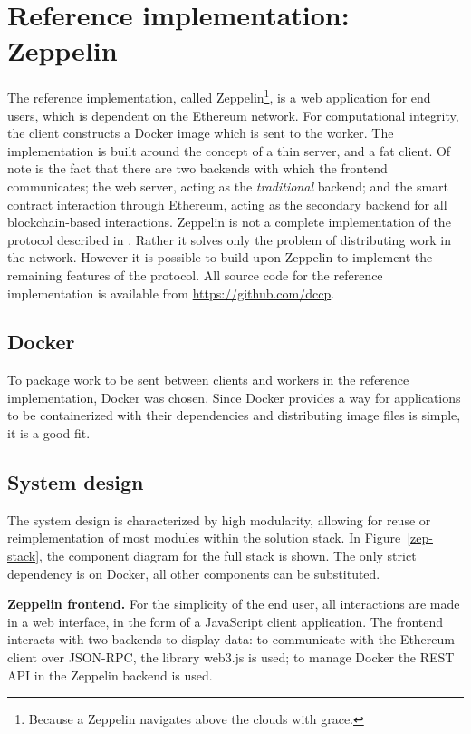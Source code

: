 \section{Reference implementation: Zeppelin}
The reference implementation, called Zeppelin\footnote{Because a Zeppelin navigates above the clouds with grace.}, is a web application for end users, which is dependent on the Ethereum network. For computational integrity, the client constructs a Docker image which is sent to the worker. The implementation is built around the concept of a thin server, and a fat client. Of note is the fact that there are two backends with which the frontend communicates; the web server, acting as the \textit{traditional} backend; and the smart contract interaction through Ethereum, acting as the secondary backend for all blockchain-based interactions. Zeppelin is not a complete implementation of the protocol described in . Rather it solves only the problem of distributing work in the network. However it is possible to build upon Zeppelin to implement the remaining features of the protocol.
All source code for the reference implementation is available from \href{https://github.com/dccp}{https://github.com/dccp}.

\subsection{Docker}
To package work to be sent between clients and workers in the reference implementation, Docker was chosen. Since Docker provides a way for applications to be containerized with their dependencies and distributing image files is simple, it is a good fit.

\subsection{System design}
The system design is characterized by high modularity, allowing for reuse or reimplementation of most modules within the solution stack. In Figure~\ref{zep-stack}, the component diagram for the full stack is shown. The only strict dependency is on Docker, all other components can be substituted.

\textbf{Zeppelin frontend.} For the simplicity of the end user, all interactions are made in a web interface, in the form of a JavaScript client application. The frontend interacts with two backends to display data: to communicate with the Ethereum client over JSON-RPC, the library web3.js is used; to manage Docker the REST API in the Zeppelin backend is used.


